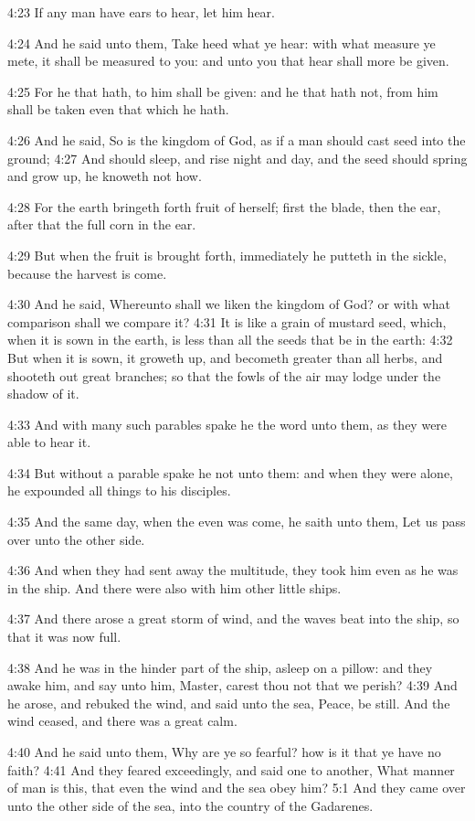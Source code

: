 4:23 If any man have ears to hear, let him hear.

4:24 And he said unto them, Take heed what ye hear: with what measure ye mete, it shall be measured to you: and unto you that hear shall more be given.

4:25 For he that hath, to him shall be given: and he that hath not, from him shall be taken even that which he hath.

4:26 And he said, So is the kingdom of God, as if a man should cast seed into the ground; 4:27 And should sleep, and rise night and day, and the seed should spring and grow up, he knoweth not how.

4:28 For the earth bringeth forth fruit of herself; first the blade, then the ear, after that the full corn in the ear.

4:29 But when the fruit is brought forth, immediately he putteth in the sickle, because the harvest is come.

4:30 And he said, Whereunto shall we liken the kingdom of God? or with what comparison shall we compare it?  4:31 It is like a grain of mustard seed, which, when it is sown in the earth, is less than all the seeds that be in the earth: 4:32 But when it is sown, it groweth up, and becometh greater than all herbs, and shooteth out great branches; so that the fowls of the air may lodge under the shadow of it.

4:33 And with many such parables spake he the word unto them, as they were able to hear it.

4:34 But without a parable spake he not unto them: and when they were alone, he expounded all things to his disciples.

4:35 And the same day, when the even was come, he saith unto them, Let us pass over unto the other side.

4:36 And when they had sent away the multitude, they took him even as he was in the ship. And there were also with him other little ships.

4:37 And there arose a great storm of wind, and the waves beat into the ship, so that it was now full.

4:38 And he was in the hinder part of the ship, asleep on a pillow: and they awake him, and say unto him, Master, carest thou not that we perish?  4:39 And he arose, and rebuked the wind, and said unto the sea, Peace, be still. And the wind ceased, and there was a great calm.

4:40 And he said unto them, Why are ye so fearful? how is it that ye have no faith?  4:41 And they feared exceedingly, and said one to another, What manner of man is this, that even the wind and the sea obey him?  5:1 And they came over unto the other side of the sea, into the country of the Gadarenes.

